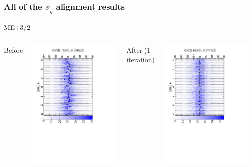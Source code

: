 \documentclass[compress]{beamer}
\begin{document}
\begin{frame}
\frametitle{All of the $\phi_y$ alignment results}
\begin{center}
ME$+$3/2
\end{center}

\begin{columns}
\centering Before

\includegraphics[height=\linewidth, angle=90]{iter01_mep32.pdf}

\centering After (1 iteration)

\includegraphics[height=\linewidth, angle=90]{iter02_mep32.pdf}
\end{columns}


\end{frame}
\end{document}
